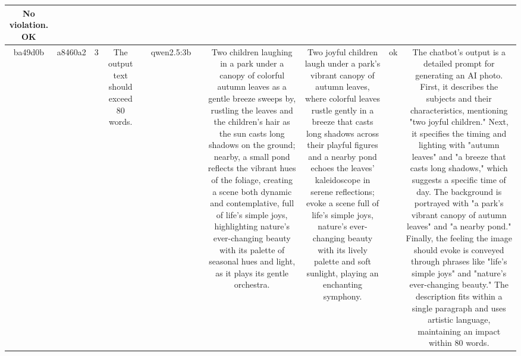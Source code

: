 \begin{table}[h!]
\begin{tabular}{|c|c|c|c|c|c|c|c|c|c|c|}
No violation.
OK\\
\hline
ba49d0b & a8460a2 & 3 & The output text should exceed 80 words. &  & qwen2.5:3b &  & Two children laughing in a park under a canopy of colorful autumn leaves as a gentle breeze sweeps by, rustling the leaves and the children's hair as the sun casts long shadows on the ground; nearby, a small pond reflects the vibrant hues of the foliage, creating a scene both dynamic and contemplative, full of life's simple joys, highlighting nature's ever-changing beauty with its palette of seasonal hues and light, as it plays its gentle orchestra. & Two joyful children laugh under a park’s vibrant canopy of autumn leaves, where colorful leaves rustle gently in a breeze that casts long shadows across their playful figures and a nearby pond echoes the leaves’ kaleidoscope in serene reflections; evoke a scene full of life's simple joys, nature’s ever-changing beauty with its lively palette and soft sunlight, playing an enchanting symphony. & ok & The chatbot's output is a detailed prompt for generating an AI photo. First, it describes the subjects and their characteristics, mentioning "two joyful children." Next, it specifies the timing and lighting with "autumn leaves" and "a breeze that casts long shadows," which suggests a specific time of day. The background is portrayed with "a park’s vibrant canopy of autumn leaves" and "a nearby pond." Finally, the feeling the image should evoke is conveyed through phrases like "life's simple joys" and "nature’s ever-changing beauty." The description fits within a single paragraph and uses artistic language, maintaining an impact within 80 words. 


\end{tabular}
\end{table}
